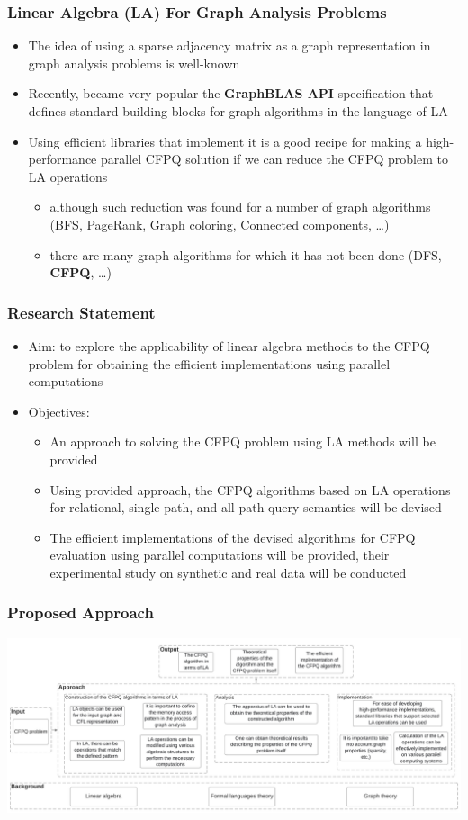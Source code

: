 \documentclass[xcolor=table,aspectratio=169]{beamer}
\begin{document}
\begin{frame}[fragile] \frametitle{Linear Algebra (LA) For Graph Analysis Problems}
	\begin{itemize}
		\item The idea of using a sparse adjacency
		matrix as a graph representation in graph analysis problems
		is well-known
		\item Recently, became very popular the \textbf{GraphBLAS API} specification that defines standard building blocks for graph
		algorithms in the language of LA
		\item Using efficient libraries that implement it is a good recipe for making a high-performance parallel CFPQ
		solution if we can reduce the CFPQ problem to LA operations
		\begin{itemize}
			\item although such reduction was found for a number of graph
			algorithms (BFS, PageRank, Graph coloring, Connected components, \ldots)
			\item there are many graph algorithms for which it has not
			been done (DFS, \textbf{CFPQ}, \ldots)
		\end{itemize}
	\end{itemize}
\end{frame}

\begin{frame}[fragile] \frametitle{Research Statement}
	\begin{itemize}
		\item Aim: to explore the applicability of linear algebra methods to the CFPQ problem for obtaining the efficient implementations using parallel computations
		\item Objectives:
		\begin{itemize}
			\item An approach to solving the CFPQ problem using	LA methods will be provided
			\item Using provided approach, the CFPQ algorithms
			based on LA operations for relational, single-path,
			and all-path query semantics will be devised
			\item The efficient implementations of the devised algorithms
			for CFPQ evaluation using parallel computations will be provided, their experimental study on synthetic and real data will be conducted
		\end{itemize}
	\end{itemize}
\end{frame}


\begin{frame}[fragile] \frametitle{Proposed Approach}
		\centering
		\includegraphics[width=15.7cm]{pictures/approach.pdf}
\end{frame}
\end{document}
